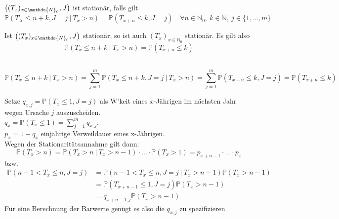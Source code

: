 $\enbrace{(T_x)_{x\in \mathds{N}_0},J}$ ist stationär, falls gilt 
\[ 
\mathds{P}(T_X\le n+k,J=j~|~T_x>n)=\mathds{P}(T_{x+n}\le k,J=j)\quad \forall n\in \mathds{N}_0,~k\in \mathds{N},~j\in \{1,\dots,m\} 
\]

Ist $\enbrace{(T_x)_{x\in \mathds{N}_0},J}$ stationär, so ist auch $(T_x)_{x\in \mathds{N}_0}$ stationär. 
Es gilt also 
\[ 
\mathds{P}(T_x\le n+k~|~T_x>n)=\mathds{P}(T_{x+n}\le k) 
\]

\\
\[ 
\mathds{P}(T_x\le n+k~|~T_x>n)= \sum_{j=1}^{m}\mathds{P}(T_x\le n+k,J=j~|~T_x>n)= \sum_{j=1}^{m}\mathds{P}(T_{x+n}\le k,J=j)= \mathds{P}(T_{x+n}\le k) 
\]

Setze $q_{x,j}=\mathds{P}(T_x\le 1,J=j)$ als W'keit eines $x$-Jährigen im nächsten Jahr wegen Ursache $j$ auszuscheiden.\\
$q_x=\mathds{P}(T_x\le 1)=\sum_{j=1}^{m}q_{x,j}$.\\
$p_x=1-q_x$ einjährige Verweildauer eines x-Jährigen.\\
Wegen der Stationaritätsannahme gilt dann: 
\[
\mathds{P}(T_x>n)=\mathds{P}(T_x>n~|~T_x>n-1)\cdot\dots \cdot \mathds{P}(T_x>1)= p_{x+n-1}\cdot \dots\cdot p_x
\]
bzw.
\begin{equation*}
\begin{aligned}
	\mathds{P}(n-1<T_x\le n,J=j) &= \mathds{P}(n-1<T_x\le n,J=j~|~T_x>n-1)\mathds{P}(T_x>n-1)\\
	&= \mathds{P}(T_{x+n-1}\le 1,J=j)\mathds{P}(T_x>n-1)\\
	&= q_{x+n-1,j}\mathds{P}(T_x>n-1)
\end{aligned}
\end{equation*}
Für eine Berechnung der Barwerte genügt es also die $q_{x,j}$ zu spezifizieren.\\

